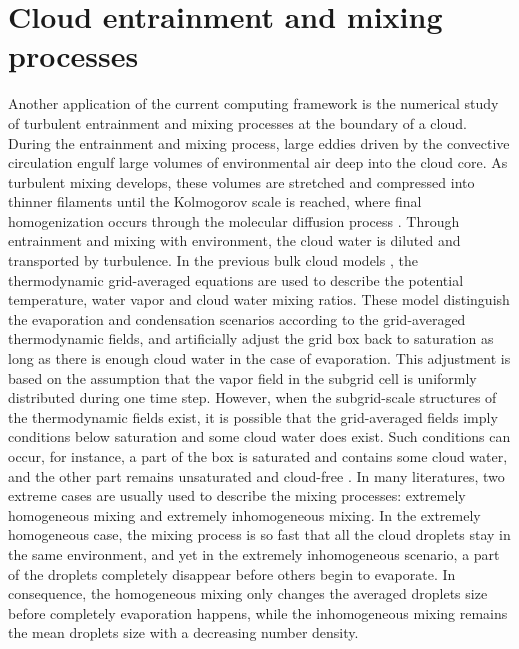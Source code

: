 \section{Cloud entrainment and mixing processes}
Another application of the current computing framework is the numerical study 
of turbulent entrainment and mixing processes at the boundary of a cloud. During the entrainment and mixing process, large eddies driven by the convective circulation engulf large volumes of environmental air deep into the cloud core. As turbulent mixing develops, these volumes are stretched and compressed into thinner filaments until the Kolmogorov scale is reached, where final homogenization occurs through the molecular diffusion process \cite{Burnet2007Observational}. Through entrainment and mixing with environment, the cloud water is diluted and transported by turbulence. In the previous bulk cloud models \cite{Grabowski1990Monotone}, the thermodynamic grid-averaged equations are used to describe the potential temperature, water vapor and cloud water mixing ratios. These model distinguish the evaporation and condensation scenarios according to the grid-averaged thermodynamic fields, and artificially adjust the grid box back to saturation as long as there is enough cloud water in the case of evaporation. This adjustment is based on the assumption that the vapor field in the subgrid cell is uniformly distributed during one time step. However, when the subgrid-scale structures of the thermodynamic fields exist, it is possible that the grid-averaged fields imply conditions below saturation and some cloud water does exist. Such conditions can occur, for instance, a part of the box is saturated and contains some cloud water, and the other part remains unsaturated and cloud-free \cite{Grabowski2007}. In many literatures\cite{Baker1980, Burnet2007Observational, Lehmann2009}, two extreme cases are usually used to describe the mixing processes: extremely homogeneous mixing and extremely inhomogeneous mixing. In the extremely homogeneous case, the mixing process is so fast that all the cloud droplets stay in the same environment, and yet in the extremely inhomogeneous scenario, a part of the droplets completely disappear before others begin to evaporate. In consequence, the homogeneous mixing only changes the averaged droplets size before completely evaporation happens, while the inhomogeneous mixing remains the mean droplets size with a decreasing number density.

